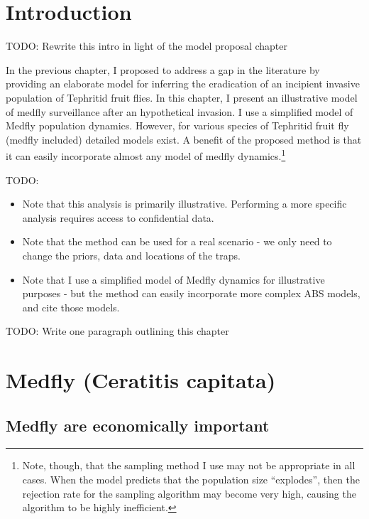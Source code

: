 \documentclass[
]{book}
\providecommand{\tightlist}{%
  \setlength{\itemsep}{0pt}\setlength{\parskip}{0pt}}
\begin{document}
\hypertarget{introduction-1}{%
\section{Introduction}\label{introduction-1}}

TODO: Rewrite this intro in light of the model proposal chapter

In the previous chapter, I proposed to address a gap in the literature by providing an elaborate model for inferring the eradication of an incipient invasive population of Tephritid fruit flies. In this chapter, I present an illustrative model of medfly surveillance after an hypothetical invasion. I use a simplified model of Medfly population dynamics. However, for various species of Tephritid fruit fly (medfly included) detailed models exist. A benefit of the proposed method is that it can easily incorporate almost any model of medfly dynamics.\footnote{Note, though, that the sampling method I use may not be appropriate in all cases. When the model predicts that the population size ``explodes'', then the rejection rate for the sampling algorithm may become very high, causing the algorithm to be highly inefficient.}

TODO:

\begin{itemize}
\tightlist
\item
  Note that this analysis is primarily illustrative. Performing a more specific analysis requires access to confidential data.
\item
  Note that the method can be used for a real scenario - we only need to change the priors, data and locations of the traps.
\item
  Note that I use a simplified model of Medfly dynamics for illustrative purposes - but the method can easily incorporate more complex ABS models, and cite those models.
\end{itemize}

TODO: Write one paragraph outlining this chapter

\hypertarget{medfly-ceratitis-capitata}{%
\section{Medfly (Ceratitis capitata)}\label{medfly-ceratitis-capitata}}

\hypertarget{medfly-are-economically-important}{%
\subsection{Medfly are economically important}\label{medfly-are-economically-important}}
\end{document}
